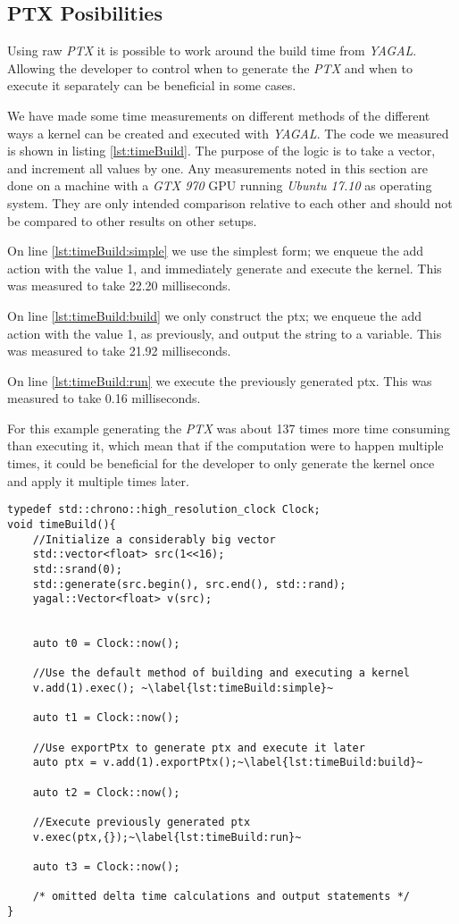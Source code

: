 \subsection{PTX Posibilities}
Using raw \textit{PTX} it is possible to work around the build time from \textit{YAGAL}. Allowing the developer to control when to generate the \textit{PTX} and when to execute it separately can be beneficial in some cases.

We have made some time measurements on different methods of the different ways a kernel can be created and executed with \textit{YAGAL}. The code we measured is shown in listing \ref{lst:timeBuild}. The purpose of the logic is to take a vector, and increment all values by one. Any measurements noted in this section are done on a machine with a \textit{GTX 970} GPU running \textit{Ubuntu 17.10} as operating system. They are only intended comparison relative to each other and should not be compared to other results on other setups.

On line \ref{lst:timeBuild:simple} we use the simplest form; we enqueue the add action with the value 1, and immediately generate and execute the kernel. This was measured to take 22.20 milliseconds.

On line \ref{lst:timeBuild:build} we only construct the ptx; we enqueue the add action with the value 1, as previously, and output the string to a variable. This was measured to take 21.92 milliseconds.

On line \ref{lst:timeBuild:run} we execute the previously generated ptx. This was measured to take 0.16 milliseconds.

For this example generating the \textit{PTX} was about 137 times more time consuming than executing it, which mean that if the computation were to happen multiple times, it could be beneficial for the developer to only generate the kernel once and apply it multiple times later.

\begin{lstlisting}[caption={Building and executing \textit{PTX} in action}, label={lst:timeBuild}]
typedef std::chrono::high_resolution_clock Clock;
void timeBuild(){
    //Initialize a considerably big vector
    std::vector<float> src(1<<16);
    std::srand(0);
    std::generate(src.begin(), src.end(), std::rand);
    yagal::Vector<float> v(src);


    auto t0 = Clock::now();

    //Use the default method of building and executing a kernel
    v.add(1).exec(); ~\label{lst:timeBuild:simple}~

    auto t1 = Clock::now();

    //Use exportPtx to generate ptx and execute it later
    auto ptx = v.add(1).exportPtx();~\label{lst:timeBuild:build}~

    auto t2 = Clock::now();

    //Execute previously generated ptx
    v.exec(ptx,{});~\label{lst:timeBuild:run}~

    auto t3 = Clock::now();

    /* omitted delta time calculations and output statements */
}
\end{lstlisting}
